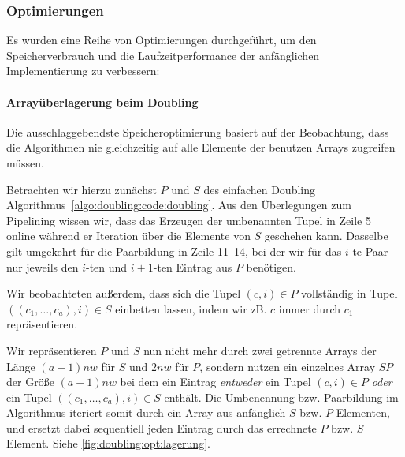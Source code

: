 \subsubsection{Optimierungen}
\label{algo:doubling:sec:used_optimizations}

Es wurden eine Reihe von Optimierungen durchgeführt, um den Speicherverbrauch und die Laufzeitperformance der anfänglichen Implementierung zu verbessern:

\paragraph{Arrayüberlagerung beim Doubling} Die ausschlaggebendste Speicheroptimierung basiert auf der Beobachtung, dass die Algorithmen nie gleichzeitig auf alle Elemente der benutzen Arrays zugreifen müssen.

Betrachten wir hierzu zunächst $P$ und $S$ des einfachen Doubling Algorithmus~\ref{algo:doubling:code:doubling}. Aus den Überlegungen zum Pipelining wissen wir, dass das Erzeugen der umbenannten Tupel in Zeile 5 online während er Iteration über die Elemente von $S$ geschehen kann. Dasselbe gilt umgekehrt für die Paarbildung in Zeile 11--14, bei der wir für das $i$-te Paar nur jeweils den $i$-ten und $i+1$-ten Eintrag aus $P$ benötigen. 

Wir beobachteten außerdem, dass sich die Tupel $(c, i) \in P$ vollständig in Tupel $((c_1, \dots, c_a), i) \in S$ einbetten lassen, indem wir zB. $c$ immer durch $c_1$ repräsentieren.

Wir repräsentieren $P$ und $S$ nun nicht mehr durch zwei getrennte Arrays der Länge $(a + 1)nw$ für $S$ und $2nw$ für $P$, sondern nutzen ein einzelnes Array $SP$ der Größe $(a + 1)nw$  bei dem ein Eintrag \textit{entweder} ein Tupel $(c, i) \in P$ \textit{oder} ein Tupel $((c_1, \dots, c_a), i) \in S$ enthält. Die Umbenennung bzw. Paarbildung im Algorithmus iteriert somit durch ein Array aus anfänglich $S$ bzw. $P$ Elementen, und ersetzt dabei sequentiell jeden Eintrag durch das errechnete $P$ bzw. $S$ Element. Siehe \cref{fig:doubling:opt:lagerung}.


